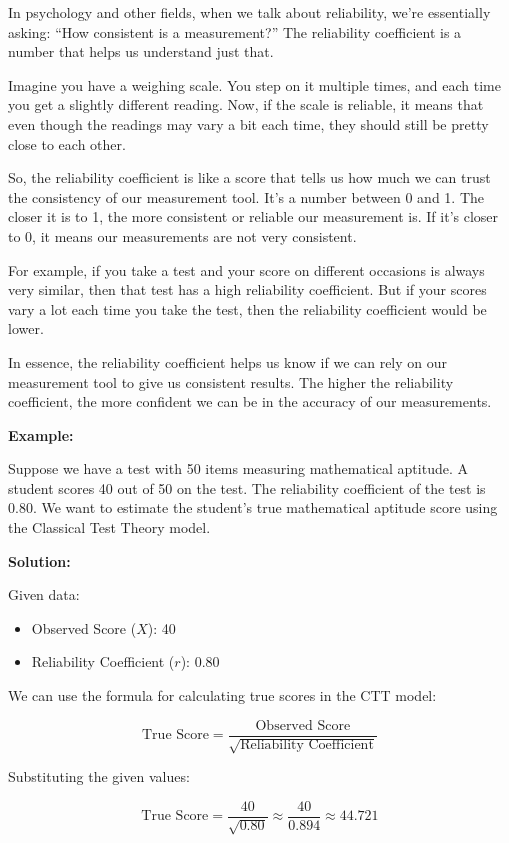 \documentclass[12pt, a4paper]{exam}
\begin{document}
In psychology and other fields, when we talk about reliability, we’re essentially asking: “How consistent is a measurement?” The reliability coefficient is a number that helps us understand just that.

Imagine you have a weighing scale. You step on it multiple times, and each time you get a slightly different reading. Now, if the scale is reliable, it means that even though the readings may vary a bit each time, they should still be pretty close to each other.

So, the reliability coefficient is like a score that tells us how much we can trust the consistency of our measurement tool. It’s a number between 0 and 1. The closer it is to 1, the more consistent or reliable our measurement is. If it’s closer to 0, it means our measurements are not very consistent.

For example, if you take a test and your score on different occasions is always very similar, then that test has a high reliability coefficient. But if your scores vary a lot each time you take the test, then the reliability coefficient would be lower.

In essence, the reliability coefficient helps us know if we can rely on our measurement tool to give us consistent results. The higher the reliability coefficient, the more confident we can be in the accuracy of our measurements.



\textbf{Example:}

Suppose we have a test with 50 items measuring mathematical aptitude. A student scores 40 out of 50 on the test. The reliability coefficient of the test is 0.80. We want to estimate the student's true mathematical aptitude score using the Classical Test Theory model.

\textbf{Solution:}

Given data:
\begin{itemize}
    \item Observed Score (\(X\)): 40
    \item Reliability Coefficient (\(r\)): 0.80
\end{itemize}

We can use the formula for calculating true scores in the CTT model:

\[
\text{True Score} = \frac{\text{Observed Score}}{\sqrt{\text{Reliability Coefficient}}}
\]

Substituting the given values:

\[
\text{True Score} = \frac{40}{\sqrt{0.80}} \approx \frac{40}{0.894} \approx 44.721
\]
\end{document}
